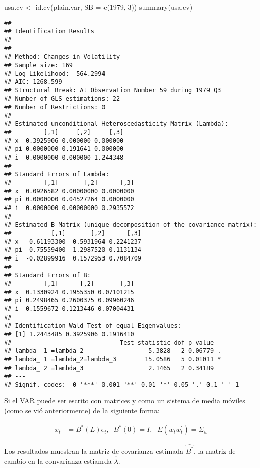 \documentclass[
]{book}
\newenvironment{Shaded}{\begin{snugshade}}{\end{snugshade}}
\newcommand{\AttributeTok}[1]{\textcolor[rgb]{0.77,0.63,0.00}{#1}}
\newcommand{\DecValTok}[1]{\textcolor[rgb]{0.00,0.00,0.81}{#1}}
\newcommand{\FunctionTok}[1]{\textcolor[rgb]{0.00,0.00,0.00}{#1}}
\newcommand{\NormalTok}[1]{#1}
\newcommand{\OtherTok}[1]{\textcolor[rgb]{0.56,0.35,0.01}{#1}}
\begin{document}
\begin{Shaded}
\begin{Highlighting}[]
\NormalTok{usa.cv }\OtherTok{\textless{}{-}} \FunctionTok{id.cv}\NormalTok{(plain.var, }\AttributeTok{SB =} \FunctionTok{c}\NormalTok{(}\DecValTok{1979}\NormalTok{, }\DecValTok{3}\NormalTok{))}
\FunctionTok{summary}\NormalTok{(usa.cv)}
\end{Highlighting}
\end{Shaded}

\begin{verbatim}
## 
## Identification Results
## ---------------------- 
## 
## Method: Changes in Volatility
## Sample size: 169
## Log-Likelihood: -564.2994
## AIC: 1268.599
## Structural Break: At Observation Number 59 during 1979 Q3
## Number of GLS estimations: 22
## Number of Restrictions: 0
## 
## Estimated unconditional Heteroscedasticity Matrix (Lambda):
##         [,1]     [,2]     [,3]
## x  0.3925906 0.000000 0.000000
## pi 0.0000000 0.191641 0.000000
## i  0.0000000 0.000000 1.244348
## 
## Standard Errors of Lambda:
##         [,1]       [,2]      [,3]
## x  0.0926582 0.00000000 0.0000000
## pi 0.0000000 0.04527264 0.0000000
## i  0.0000000 0.00000000 0.2935572
## 
## Estimated B Matrix (unique decomposition of the covariance matrix): 
##           [,1]       [,2]      [,3]
## x   0.61193300 -0.5931964 0.2241237
## pi  0.75559400  1.2987520 0.1131134
## i  -0.02899916  0.1572953 0.7084709
## 
## Standard Errors of B:
##         [,1]      [,2]       [,3]
## x  0.1330924 0.1955350 0.07101215
## pi 0.2498465 0.2600375 0.09960246
## i  0.1559672 0.1213446 0.07004431
## 
## Identification Wald Test of equal Eigenvalues:
## [1] 1.2443485 0.3925906 0.1916410
##                              Test statistic dof p-value  
## lambda_ 1 =lambda_2                  5.3828   2 0.06779 .
## lambda_ 1 =lambda_2=lambda_3        15.0586   5 0.01011 *
## lambda_ 2 =lambda_3                  2.1465   2 0.34189  
## ---
## Signif. codes:  0 '***' 0.001 '**' 0.01 '*' 0.05 '.' 0.1 ' ' 1
\end{verbatim}

Si el VAR puede ser escrito con matrices y como un sistema de media móviles (como se vió anteriormente) de la siguiente forma:

\begin{align}
x_{t}&=B^{*}(L)\epsilon_{t},\;\;B^{*}(0)=I,\;\;E(w_{t}w_{t}^{'})=\Sigma_w 
\end{align}

Los resultados muestran la matriz de covarianza estimada \(\hat{B^{*}}\), la matriz de cambio en la convarianza estiamda \(\hat{\lambda}\).
\end{document}
